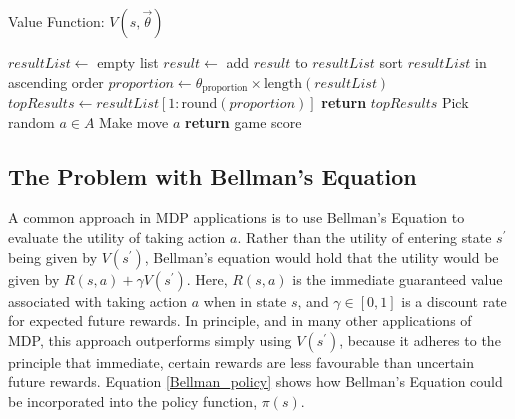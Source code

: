 \documentclass{article}
\begin{document}
\begin{algorithm}
    \caption{Value Function: $V(s, \vec{\theta})$}
    \label{value_function}
    \begin{algorithmic}[1]
            \State $resultList \gets$ empty list
                \State $result \gets$  
                \State add $result$ to $resultList$ 
            \EndFor
            \State sort $resultList$ in ascending order
            \State $proportion \gets \theta_{\text{proportion}} \times \text{length}(resultList)$
            \State $topResults \gets resultList[1:\text{round}(proportion)]$ 
            \State \textbf{return} $topResults$
        \EndFunction
        \Statex
                \State Pick random $a \in A$
                \State Make move $a$
            \EndWhile
            \State \textbf{return} game score
        \EndFunction
    \end{algorithmic}
\end{algorithm}

\subsection{The Problem with Bellman's Equation}
A common approach in MDP applications is to use Bellman's Equation to evaluate the utility of taking action $a$.  Rather than the utility of entering state $s^\prime$ being given by $V(s^\prime)$, Bellman's equation would hold that the utility would be given by $R(s, a) + \gamma V(s^\prime)$.  Here, $R(s, a)$ is the immediate guaranteed value associated with taking action $a$ when in state $s$, and $\gamma \in [0, 1]$ is a discount rate for expected future rewards.  In principle, and in many other applications of MDP, this approach outperforms simply using $V(s^\prime)$, because it adheres to the principle that immediate, certain rewards are less favourable than uncertain future rewards.  Equation \ref{Bellman_policy} shows how Bellman's Equation could be incorporated into the policy function, $\pi (s)$.
\end{document}
